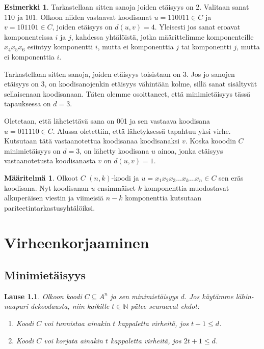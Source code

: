 \documentclass[a4paper,12pt,leqno,oneside]{report} %
\theoremstyle{plain}
\newtheorem{lause}{Lause}[chapter]
\theoremstyle{plain}
\theoremstyle{definition}
\newtheorem{maaritelma}{Määritelmä}[chapter]
\newtheorem{esimerkki}{Esimerkki}[chapter]
\theoremstyle{remark}
\numberwithin{equation}{chapter}
\newcommand*{\Nset}{\mathbb{N}}  %
\begin{document}
\begin{esimerkki}
        Tarkastellaan sitten sanoja joiden etäisyys on 2. Valitaan sanat $110$ ja $101$. Olkoon niiden vastaavat koodisanat $u = 110011 \in C$ ja $v = 101101 \in C$, joiden etäisyys on $d(u, v) = 4$. Yleisesti jos sanat eroavat komponenteissa $i$ ja $j$, kahdessa yhtälöistä, jotka määrittelimme komponenteille $x_4x_5x_6$ esiintyy komponentti $i$, mutta ei komponenttia $j$ tai komponentti $j$, mutta ei komponenttia $i$.

        Tarkastellaan sitten sanoja, joiden etäisyys toisistaan on 3. Jos jo sanojen etäisyys on 3, on koodisanojenkin etäisyys vähintään kolme, sillä sanat sisältyvät sellaisenaan koodisanaan. Täten olemme osoittaneet, että minimietäisyys tässä tapauksessa on $d = 3$.

        Oletetaan, että lähetettävä sana on 001 ja sen vastaava koodisana $u = 011110 \in C$.
        Alussa oletettiin, että lähetyksessä tapahtuu yksi virhe. Kutsutaan tätä vastaanotettua koodisanaa koodisanaksi $v$. Koska kooodin $C$ minimietäisyys on $d = 3$, on lähetty koodisana $u$ ainoa, jonka etäisyys vastaanotetusta koodisanasta $v$ on $d(u,v) = 1$.
    \end{esimerkki}

    \begin{maaritelma}\label{maar:nkkoodi}
        Olkoot $C$ $(n, k)$-koodi ja $u = x_1x_2x_3\dots x_k \dots x_n \in C$ sen eräs koodisana. Nyt koodisanan $u$ ensimmäiset $k$ komponenttia muodostavat alkuperäisen viestin ja viimeisiä $n-k$ komponenttia kutsutaan pariteetintarkastusyhtälöiksi.
    \end{maaritelma}

    \chapter{Virheenkorjaaminen}
    \section{Minimietäisyys}

    \begin{lause}\label{lause:nncorrection}
        Olkoon koodi $C \subseteq A^n$ ja sen minimietäisyys $d$. Jos käytämme lähin-naapuri dekoodausta, niin kaikille $t \in \Nset$ pätee seuraavat ehdot:
        \begin{enumerate}
            \item\label{kht:vtunnistus} Koodi $C$ voi tunnistaa ainakin $t$ kappaletta virheitä, jos $t + 1 \le d$.
            \item\label{kht:vkorjaus} Koodi $C$ voi korjata ainakin $t$ kappaletta virheitä, jos $2t + 1 \le d$.
        \end{enumerate}
    \end{lause}
\end{document}
